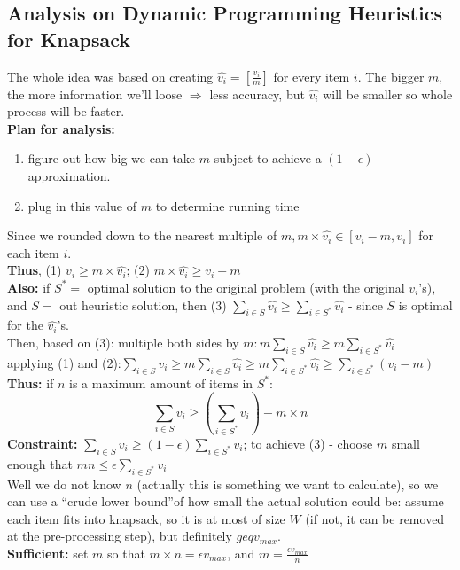 \documentclass{scrartcl}
\begin{document}
\subsection{Analysis on Dynamic Programming Heuristics for Knapsack}
\label{sec:18-6}
The whole idea was based on creating $\hat{v_i} = [ \frac{v_i}m]$ for every item
$i$. The bigger $m$, the more information we'll loose $\Rightarrow$ less
accuracy, but $\hat{v_i}$ will be smaller so whole process will be faster.\\
{\bf Plan for analysis: }
\begin{enumerate}
\item figure out how big we can take $m$ subject to achieve a $(1-\epsilon)$ -
  approximation. 
\item plug in this value of $m$ to determine running time
\end{enumerate}
Since we rounded down to the nearest multiple of $m, m \times \hat{v_i} \in [v_i
- m, v_i]$ for each item $i$.\\
{\bf Thus}, (1) $v_i \geq m \times \hat{v_i}$; (2) $m \times \hat{v_i} \geq v_i
- m$\\
{\bf Also: } if $S^* =$ optimal solution to the original problem (with the
original $v_i$'s), and $S = $ out heuristic solution, then (3) $\sum \limits_{i
  \in S} \hat{v_i} \geq \sum \limits_{i \in S^*} \hat{v_i}$ - since $S$ is
optimal for the $\hat{v_i}$'s.\\
Then, based on (3): multiple both sides by $m : m \sum \limits_{i \in S} \hat{v_i}
\geq m \sum \limits_{i \in S^*} \hat{v_i}$\\
applying (1) and (2):$\sum \limits_{i \in S} v_i \geq m \sum \limits_{i \in S}
\hat{v_i} \geq m \sum \limits_{i \in S^*} \hat{v_i} \geq \sum \limits_{i \in
  S^*} (v_i-m)$\\
{\bf Thus: } if $n$ is a maximum amount of items in $S^*$: 
$$\sum \limits_{i \in S} v_i \geq (\sum \limits_{i \in S^*} v_i) - m \times n $$
{\bf Constraint: } $\sum \limits_{i \in S} v_i \geq (1-\epsilon) \sum \limits_{i
  \in S^*} v_i$; to achieve (3) - choose $m$ small enough that $mn \leq \epsilon
\sum \limits_{i \in S^*} v_i$\\
Well we do not know $n$ (actually this is something we want to calculate), so we
can use a ``crude lower bound''of how small the actual solution could be: assume
each item fits into knapsack, so it is at most of size $W$ (if not, it can be
removed at the pre-processing step), but definitely $geq v_{max}$.\\
{\bf Sufficient: } set $m$ so that $m \times n = \epsilon v_{max}$, and $m =
\frac{\epsilon v_{max}}n$\\
\end{document}

